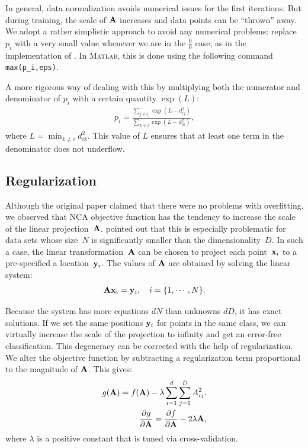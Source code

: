 	
	In general, data normalization avoids numerical issues for the first iterations. But during training, the scale of $\mathbf{A}$ increases and data points can be ``thrown'' away. We adopt a rather simplistic approach to avoid any numerical problems: replace $p_i$ with a very small value whenever we are in the $\frac{0}{0}$ case, as in the implementation of \citet{maaten-online}. In \textsc{Matlab}, this is done using the following command \texttt{max(p\_i,eps)}. 
    
	A more rigorous way of dealing with this by multiplying both the numerator and denominator of $p_i$ with a certain quantity $\exp(L)$:
	\begin{align}
	  p_i = \frac{\sum_{j\in c_i} \exp(L-d_{ij}^2)}{\sum_{k\neq i} \exp(L-d_{ik}^2)},
	\end{align}
	where $L = \min_{k\neq i} d_{ik}^2$. This value of $L$ ensures that at least one term in the denominator does not underflow.


\subsection{Regularization}
\label{subsec:regularization}

  Although the original paper \citep{goldberger2004} claimed that there were no problems with overfitting, we observed that NCA objective function has the tendency to increase the scale of the linear projection~$\mathbf{A}$. \citet{butman2008} pointed out that this is especially problematic for data sets whose size~$N$ is significantly smaller than the dimensionality~$D$. In such a case, the linear transformation~$\mathbf{A}$ can be chosen to project each point~$\mathbf{x}_i$ to a pre-specified a location~$\mathbf{y}_i$. The values of $\mathbf{A}$ are obtained by solving the linear system:
  \begin{align}
    \mathbf{A}\mathbf{x}_i = \mathbf{y}_i, \quad i = \{1,\cdots,N\}.
  \end{align}

  Because the system has more equations $dN$ than unknowns $dD$, it has exact solutions. If we set the same positions $\mathbf{y}_i$ for points in the same class, we can virtually increase the scale of the projection to infinity and get an error-free classification. This degeneracy can be corrected with the help of regularization. We alter the objective function by subtracting a regularization term proportional to the magnitude of $\mathbf{A}$. This gives:
  \begin{align}
    g(\mathbf{A}) = f(\mathbf{A}) - \lambda \sum_{i=1}^d\sum_{j=1}^D A_{ij}^2.\\
            \frac{\partial g}{\partial \mathbf{A}} = \frac{\partial f}{\partial \mathbf{A}} - 2\lambda\mathbf{A},
  \end{align}
  where $\lambda$ is a positive constant that is tuned via cross-validation.

